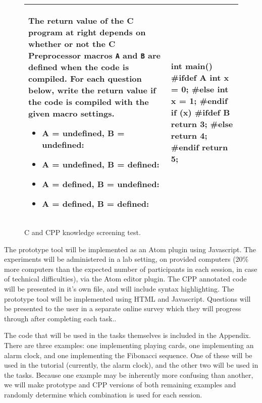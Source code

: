 \documentclass[11pt]{article}
\begin{document}
	\begin{figure}
		\centering
		\begin{tabular}{|m{10cm}|m{3cm}|}
			\hline
			The return value of the C program at right depends on whether or not the C
			Preprocessor macros \texttt{A} and \texttt{B} are defined when the code is
			compiled.  For each question below, write the return value if the code is
			compiled with the given macro settings.
			\begin{itemize}[itemsep=1em]
				\item A = undefined, B = undefined: 
				\item A = undefined, B = defined: 
				\item A = defined, B = undefined: 
				\item A = defined, B = defined: 
			\end{itemize}
			&
			\begin{code}
				int main() {
					#ifdef A
					int x = 0;
					#else
					int x = 1;
					#endif 
					if (x) {
						#ifdef B
						return 3;
						#else
						return 4;
						#endif
					}
					return 5;
				}
			\end{code}
			\\ \hline
		\end{tabular}
		\caption{C and CPP knowledge screening test.}
		\label{fig:screen}
	\end{figure}
	
	The prototype tool will be implemented as an Atom plugin using Javascript.
	The experiments will be administered in a lab setting, on provided computers
	(20\% more computers than the expected number of participants in each session,
	in case of technical difficulties), via the Atom editor plugin.  The CPP annotated code
	will be presented in it's own file, and will include syntax
	highlighting.  The prototype tool will be implemented using HTML and
	Javascript.  Questions will be presented to the user in a separate online survey which they will progress through after completing each task..
	
	The code that will be used in the tasks themselves is included in the Appendix.
	There are three examples: one implementing playing cards, one implementing an
	alarm clock, and one implementing the Fibonacci sequence.  One of these will be
	used in the tutorial (currently, the alarm clock), and the other two will be
	used in the tasks.  Because one example may be inherently more confusing than
	another, we will make prototype and CPP versions of both remaining examples and
	randomly determine which combination is used for each session.
	
\end{document}
